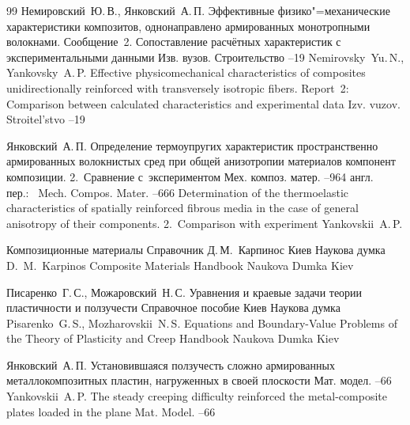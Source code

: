 \begin{thebibliography}{99}
\by Немировский~Ю.\,В., Янковский~А.\,П.
\paper Эффективные физико"=механические характеристики композитов, однонаправлено армированных монотропными волокнами. Сообщение~2. Сопоставление расчётных характеристик с экспериментальными данными
\jour Изв. вузов. Строительство
--19
\misctransl
\by Nemirovsky~Yu.\,N., Yankovsky~A.\,P.
\paper Effective physicomechanical characteristics of composites unidirectionally reinforced with transversely isotropic fibers. Report~2: Comparison between calculated characteristics and experimental data
\jour Izv. vuzov. Stroitel'stvo 
--19


\by Янковский~А.\,П.
\paper Определение термоупругих характеристик пространственно армированных волокнистых сред при общей анизотропии
 материалов компонент композиции. 2.~Сравнение с~экспериментом
 \jour Мех. композ. матер.
 --964
 \transl англ. пер.:~
\jour Mech. Compos. Mater.
--666
\paper Determination of the thermoelastic characteristics of spatially reinforced fibrous media in the case of general anisotropy of their components. 2.~Comparison with experiment
\by Yankovskii~A.\,P.


\book Композиционные материалы
\bookinfo Справочник
\ed Д.\,М.~Карпинос
\publaddr Киев
\publ Наукова думка
\misctransl
\ed D.~M.~Karpinos 
\book Composite Materials
\bookinfo Handbook 
\publ Naukova Dumka
\publaddr Kiev 

\by Писаренко~Г.\,С., Можаровский~Н.\,С.
\book Уравнения и краевые задачи теории пластичности и ползучести
\bookinfo Справочное пособие
\publaddr Киев
\publ Наукова думка
\misctransl
\by Pisarenko~G.\,S.,  Mozharovskii~N.\,S.
\book Equations and Boundary-Value Problems of the Theory of Plasticity and Creep
\bookinfo Handbook 
\publ Naukova Dumka
\publaddr Kiev 

\by Янковский~А.\,П.
\paper Установившаяся ползучесть сложно армированных металлокомпозитных пластин, нагруженных в своей плоскости
\jour Мат. модел.
--66
\misctransl
\by Yankovskii~A.\,P.
\paper The steady creeping difficulty reinforced the metal-composite plates loaded in the plane 
\jour Mat. Model. 
--66 


\end{thebibliography}
